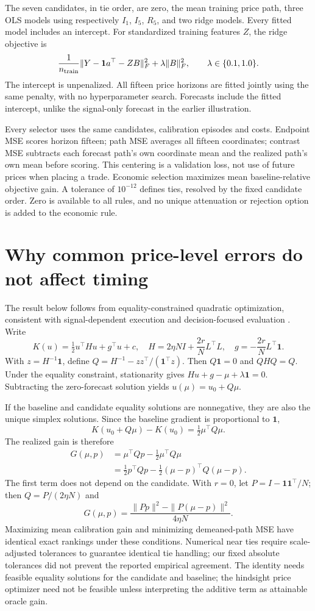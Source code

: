 \documentclass[11pt]{article}
\begin{document}
The seven candidates, in tie order, are zero, the mean training price path, three OLS models using respectively $I_1$, $I_5$, $R_5$, and two ridge models. Every fitted model includes an intercept. For standardized training features $Z$, the ridge objective is
\[
\frac1{n_{\rm train}}\|Y-\mathbf1a^\top-ZB\|_F^2+\lambda\|B\|_F^2,
\qquad\lambda\in\{0.1,1.0\}.
\]
The intercept is unpenalized. All fifteen price horizons are fitted jointly using the same penalty, with no hyperparameter search. Forecasts include the fitted intercept, unlike the signal-only forecast in the earlier illustration.

Every selector uses the same candidates, calibration episodes and costs. Endpoint MSE scores horizon fifteen; path MSE averages all fifteen coordinates; contrast MSE subtracts each forecast path's own coordinate mean and the realized path's own mean before scoring. This centering is a validation loss, not use of future prices when placing a trade. Economic selection maximizes mean baseline-relative objective gain. A tolerance of $10^{-12}$ defines ties, resolved by the fixed candidate order. Zero is available to all rules, and no unique attenuation or rejection option is added to the economic rule.
\section{Why common price-level errors do not affect timing}
The result below follows from equality-constrained quadratic optimization, consistent with signal-dependent execution and decision-focused evaluation \citep{almgren2001,forde2022,abijaber2025,elmachtoub2022}. Write
\[
K(u)=\tfrac12u^\top Hu+g^\top u+c,
\quad H=2\eta NI+\frac{2r}{N}L^\top L,
\quad g=-\frac{2r}{N}L^\top\mathbf1.
\]
With $z=H^{-1}\mathbf1$, define $Q=H^{-1}-zz^\top/(\mathbf1^\top z)$. Then $Q\mathbf1=0$ and $QHQ=Q$. Under the equality constraint, stationarity gives $Hu+g-\mu+\lambda\mathbf1=0$. Subtracting the zero-forecast solution yields $u(\mu)=u_0+Q\mu$.

If the baseline and candidate equality solutions are nonnegative, they are also the unique simplex solutions. Since the baseline gradient is proportional to $\mathbf1$,
\[
K(u_0+Q\mu)-K(u_0)=\tfrac12\mu^\top Q\mu.
\]
The realized gain is therefore
\begin{align*}
G(\mu,p)&=\mu^\top Qp-\tfrac12\mu^\top Q\mu\\
&=\tfrac12p^\top Qp-\tfrac12(\mu-p)^\top Q(\mu-p).
\end{align*}
The first term does not depend on the candidate. With $r=0$, let $P=I-\mathbf1\mathbf1^\top/N$; then $Q=P/(2\eta N)$ and
\[
G(\mu,p)=\frac{\|Pp\|^2-\|P(\mu-p)\|^2}{4\eta N}.
\]
Maximizing mean calibration gain and minimizing demeaned-path MSE have identical exact rankings under these conditions. Numerical near ties require scale-adjusted tolerances to guarantee identical tie handling; our fixed absolute tolerances did not prevent the reported empirical agreement. The identity needs feasible equality solutions for the candidate and baseline; the hindsight price optimizer need not be feasible unless interpreting the additive term as attainable oracle gain.
\end{document}
